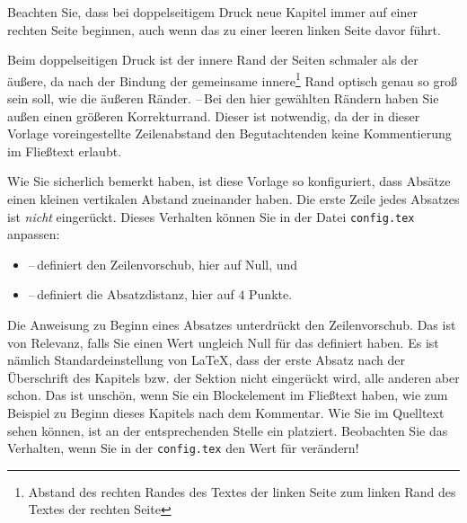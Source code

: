 
Beachten Sie, dass bei doppelseitigem Druck neue Kapitel immer auf einer rechten Seite beginnen, auch wenn das zu einer leeren linken Seite davor führt.

Beim doppelseitigen Druck ist der innere Rand der Seiten schmaler als der äußere, da nach der Bindung der gemeinsame innere\footnote{Abstand des rechten Randes des Textes der linken Seite zum linken Rand des Textes der rechten Seite} Rand optisch genau so groß sein soll, wie die äußeren Ränder. --\,Bei den hier gewählten Rändern haben Sie außen einen größeren Korrekturrand. Dieser ist notwendig, da der in dieser Vorlage voreingestellte Zeilenabstand den Begutachtenden keine Kommentierung im Fließtext erlaubt.

Wie Sie sicherlich bemerkt haben, ist diese Vorlage so konfiguriert, dass Absätze einen kleinen vertikalen Abstand zueinander haben. Die erste Zeile jedes Absatzes ist \emph{nicht} eingerückt. Dieses Verhalten können Sie in der Datei \texttt{config.tex} anpassen:
\begin{itemize}
    \item {} --\,definiert den Zeilenvorschub, hier auf Null, und
    \item {} --\,definiert die Absatzdistanz, hier auf $4$ Punkte.
\end{itemize}

Die Anweisung  zu Beginn eines Absatzes unterdrückt den Zeilenvorschub. Das ist von Relevanz, falls Sie einen Wert ungleich Null für das  definiert haben. Es ist nämlich Standardeinstellung von \LaTeX{}, dass der erste Absatz nach der Überschrift des Kapitels bzw. der Sektion nicht eingerückt wird, alle anderen aber schon. Das ist unschön, wenn Sie ein Blockelement im Fließtext haben, wie zum Beispiel zu Beginn dieses Kapitels nach dem Kommentar. Wie Sie im Quelltext sehen können, ist an der entsprechenden Stelle ein  platziert. Beobachten Sie das Verhalten, wenn Sie in der \texttt{config.tex} den Wert für  verändern!


